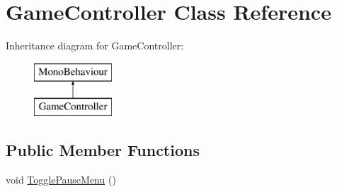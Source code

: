 \hypertarget{class_game_controller}{}\section{Game\+Controller Class Reference}
\label{class_game_controller}
Inheritance diagram for Game\+Controller\+:\begin{figure}[H]
\begin{center}
\leavevmode
\includegraphics[height=2.000000cm]{class_game_controller}
\end{center}
\end{figure}
\subsection*{Public Member Functions}
\begin{DoxyCompactItemize}
\item 
void \hyperlink{class_game_controller_a0b2f5dd3890fd4897ca83421d9ce439c}{Toggle\+Pause\+Menu} ()
\end{DoxyCompactItemize}
